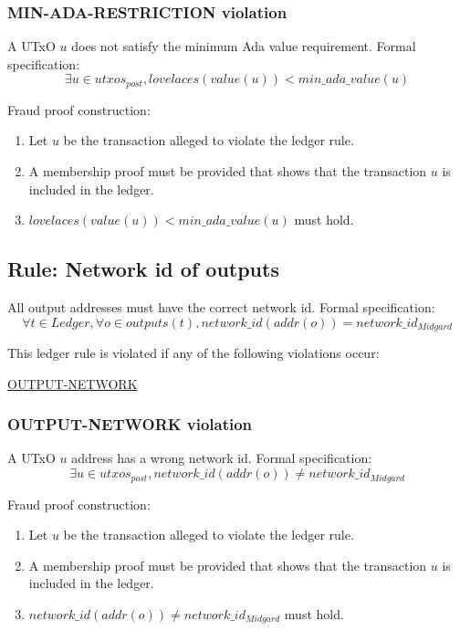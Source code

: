 \documentclass[../midgard.tex]{subfiles}
\begin{document}
\subsubsection{MIN-ADA-RESTRICTION violation}
\label{violation:MIN-ADA-RESTRICTION}
A UTxO $u$ does not satisfy the minimum Ada value requirement.
Formal specification:
\begin{equation*}
  \exists u \in utxos_{post}, lovelaces(value(u)) < min\_ada\_value(u)
\end{equation*}

Fraud proof construction:
\begin{enumerate}
  \item Let $u$ be the transaction alleged to violate the ledger rule.
  \item A membership proof must be provided that shows that the transaction $u$ is included in the ledger.
  \item $lovelaces(value(u)) < min\_ada\_value(u)$ must hold.
\end{enumerate}

\subsection{Rule: Network id of outputs}
\label{rule:network-id-of-outputs}
All output addresses must have the correct network id.
Formal specification:
\begin{equation*}
    \forall t \in Ledger, \forall o \in outputs(t), network\_id(addr(o)) = network\_id_{Midgard}
\end{equation*}

This ledger rule is violated if any of the following violations occur:
\begin{itemize-multi}
  \item \hyperref[violation:OUTPUT-NETWORK]{OUTPUT-NETWORK}
\end{itemize-multi}

\subsubsection{OUTPUT-NETWORK violation}
\label{violation:OUTPUT-NETWORK}
A UTxO $u$ address has a wrong network id.
Formal specification:
\begin{equation*}
  \exists u \in utxos_{post}, network\_id(addr(o)) \neq network\_id_{Midgard}
\end{equation*}

Fraud proof construction:
\begin{enumerate}
  \item Let $u$ be the transaction alleged to violate the ledger rule.
  \item A membership proof must be provided that shows that the transaction $u$ is included in the ledger.
  \item $network\_id(addr(o)) \neq network\_id_{Midgard}$ must hold.
\end{enumerate}
\end{document}

